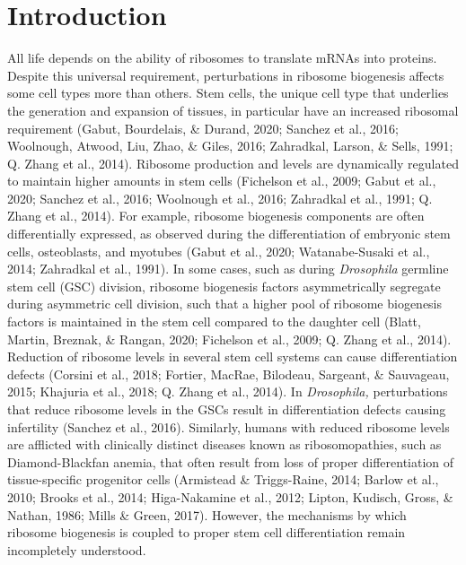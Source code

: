 \documentclass[12pt,oneside]{reedthesis}
\begin{document}
\hypertarget{introduction-1}{%
\section{Introduction}\label{introduction-1}}

All life depends on the ability of ribosomes to translate mRNAs into proteins. Despite this universal requirement, perturbations in ribosome biogenesis affects some cell types more than others. Stem cells, the unique cell type that underlies the generation and expansion of tissues, in particular have an increased ribosomal requirement (Gabut, Bourdelais, \& Durand, 2020; Sanchez et al., 2016; Woolnough, Atwood, Liu, Zhao, \& Giles, 2016; Zahradkal, Larson, \& Sells, 1991; Q. Zhang et al., 2014). Ribosome production and levels are dynamically regulated to maintain higher amounts in stem cells (Fichelson et al., 2009; Gabut et al., 2020; Sanchez et al., 2016; Woolnough et al., 2016; Zahradkal et al., 1991; Q. Zhang et al., 2014). For example, ribosome biogenesis components are often differentially expressed, as observed during the differentiation of embryonic stem cells, osteoblasts, and myotubes (Gabut et al., 2020; Watanabe-Susaki et al., 2014; Zahradkal et al., 1991). In some cases, such as during \emph{Drosophila} germline stem cell (GSC) division, ribosome biogenesis factors asymmetrically segregate during asymmetric cell division, such that a higher pool of ribosome biogenesis factors is maintained in the stem cell compared to the daughter cell (Blatt, Martin, Breznak, \& Rangan, 2020; Fichelson et al., 2009; Q. Zhang et al., 2014). Reduction of ribosome levels in several stem cell systems can cause differentiation defects (Corsini et al., 2018; Fortier, MacRae, Bilodeau, Sargeant, \& Sauvageau, 2015; Khajuria et al., 2018; Q. Zhang et al., 2014). In \emph{Drosophila,} perturbations that reduce ribosome levels in the GSCs result in differentiation defects causing infertility (Sanchez et al., 2016). Similarly, humans with reduced ribosome levels are afflicted with clinically distinct diseases known as ribosomopathies, such as Diamond-Blackfan anemia, that often result from loss of proper differentiation of tissue-specific progenitor cells (Armistead \& Triggs-Raine, 2014; Barlow et al., 2010; Brooks et al., 2014; Higa-Nakamine et al., 2012; Lipton, Kudisch, Gross, \& Nathan, 1986; Mills \& Green, 2017). However, the mechanisms by which ribosome biogenesis is coupled to proper stem cell differentiation remain incompletely understood.
\end{document}
